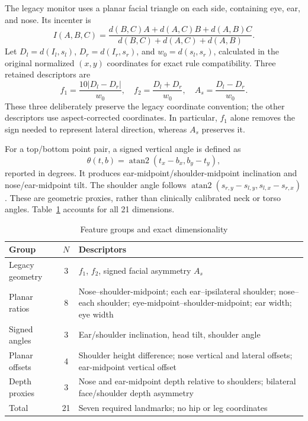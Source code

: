 \documentclass[conference]{IEEEtran}
\newcommand{\smalltable}{\setlength{\tabcolsep}{3.5pt}\renewcommand{\arraystretch}{1.12}\footnotesize}
\begin{document}
The legacy monitor uses a planar facial triangle on each side, containing eye, ear, and nose. Its incenter is
\begin{equation}
I(A,B,C)=\frac{d(B,C)A+d(A,C)B+d(A,B)C}{d(B,C)+d(A,C)+d(A,B)}.
\end{equation}
Let $D_l=d(I_l,s_l)$, $D_r=d(I_r,s_r)$, and $w_0=d(s_l,s_r)$, calculated in the original normalized $(x,y)$ coordinates for exact rule compatibility. Three retained descriptors are
\begin{equation}
f_1=\frac{10|D_l-D_r|}{w_0},\quad f_2=\frac{D_l+D_r}{w_0},\quad A_s=\frac{D_l-D_r}{w_0}.
\end{equation}
These three deliberately preserve the legacy coordinate convention; the other descriptors use aspect-corrected coordinates. In particular, $f_1$ alone removes the sign needed to represent lateral direction, whereas $A_s$ preserves it.

For a top/bottom point pair, a signed vertical angle is defined as
\begin{equation}
\theta(t,b)=\operatorname{atan2}(t_x-b_x,b_y-t_y),
\end{equation}
reported in degrees. It produces ear-midpoint/shoulder-midpoint inclination and nose/ear-midpoint tilt. The shoulder angle follows $\operatorname{atan2}(s_{r,y}-s_{l,y},s_{l,x}-s_{r,x})$. These are geometric proxies, rather than clinically calibrated neck or torso angles. Table~\ref{tab:features} accounts for all 21 dimensions.

\begin{table}[t]\caption{Feature groups and exact dimensionality}\label{tab:features}\centering\smalltable
\begin{tabular}{p{}cp{}}
\toprule Group & $N$ & Descriptors\\\midrule
Legacy geometry & 3 & $f_1$, $f_2$, signed facial asymmetry $A_s$\\
Planar ratios & 8 & Nose--shoulder-midpoint; each ear--ipsilateral shoulder; nose--each shoulder; eye-midpoint--shoulder-midpoint; ear width; eye width\\
Signed angles & 3 & Ear/shoulder inclination, head tilt, shoulder angle\\
Planar offsets & 4 & Shoulder height difference; nose vertical and lateral offsets; ear-midpoint vertical offset\\
Depth proxies & 3 & Nose and ear-midpoint depth relative to shoulders; bilateral face/shoulder depth asymmetry\\\midrule
Total & 21 & Seven required landmarks; no hip or leg coordinates\\\bottomrule
\end{tabular}\end{table}
\end{document}
